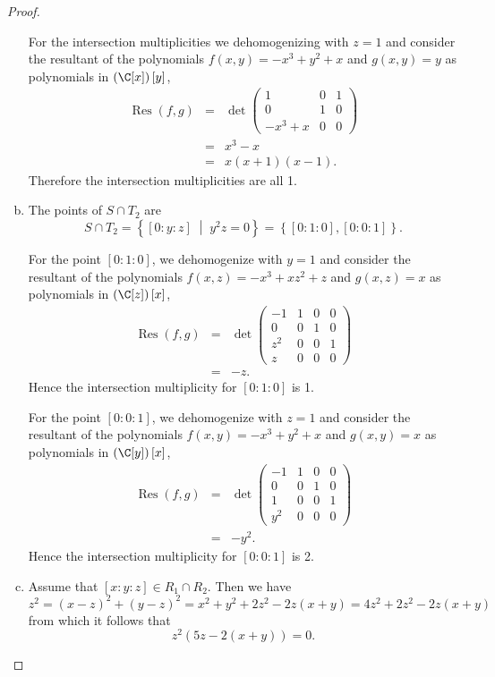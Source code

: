 \documentclass[10pt]{amsart}
\begin{document}
\begin{thm}
\begin{proof}
\begin{enumerate}[(a)]
      For the intersection multiplicities we dehomogenizing with $z = 1$ and consider the resultant of the polynomials $f(x,y) = -x^{3} + y^{2} + x$ and $g(x,y) = y$ as polynomials in $\left(\C[x]\right)[y]$,
      \begin{eqnarray*}
        \operatorname{Res}(f,g) &=& \det \left(\begin{array}{ccc}
          1 & 0 & 1 \\
          0 & 1 & 0 \\
          -x^{3} + x & 0 & 0
        \end{array}\right)\\
        &=& x^3 - x\\
        &=& x(x+1)(x-1).
      \end{eqnarray*}
      Therefore the intersection multiplicities are all 1.
    \item
      The points of $S \cap T_2$ are
      $$S \cap T_2 = \left\{ [0 : y : z] \;\middle\vert\; y^2z = 0 \right\} = \left\{[0 : 1 : 0], [0 : 0 : 1]\right\}.$$
      
      For the point $[0 : 1 : 0]$, we dehomogenize with $y = 1$ and consider the resultant of the polynomials $f(x,z) = -x^{3} + x z^{2} + z$ and $g(x,z) = x$ as polynomials in $\left(\C[z]\right)[x]$,
      \begin{eqnarray*}
        \operatorname{Res}(f,g) &=& \det\left(\begin{array}{cccc}
          -1 & 1 & 0 & 0 \\
          0 & 0 & 1 & 0 \\
          z^{2} & 0 & 0 & 1 \\
          z & 0 & 0 & 0
        \end{array}\right)\\
        &=& -z.
      \end{eqnarray*}
      Hence the intersection multiplicity for $[0 : 1 : 0]$ is 1.
      
      For the point $[0 : 0 : 1]$, we dehomogenize with $z = 1$ and consider the resultant of the polynomials $f(x,y) = -x^{3} + y^{2} + x$ and $g(x,y) = x$ as polynomials in $\left(\C[y]\right)[x]$,
      \begin{eqnarray*}
        \operatorname{Res}(f,g) &=& \det \left(\begin{array}{cccc}
          -1 & 1 & 0 & 0 \\
          0 & 0 & 1 & 0 \\
          1 & 0 & 0 & 1 \\
          y^{2} & 0 & 0 & 0
        \end{array}\right)\\
        &=& -y^2.
      \end{eqnarray*}
      Hence the intersection multiplicity for $[0 : 0 : 1]$ is 2.
    \item
      Assume that $[x : y : z] \in R_1 \cap R_2$.
      Then we have
      $$z^2 = (x - z)^2 + (y - z)^2 = x^2 + y^2 + 2z^2 - 2z(x + y) = 4z^2 + 2z^2 - 2z(x + y)$$
      from which it follows that
      $$z^2(5z - 2(x + y)) = 0.$$
      

\end{enumerate}
\end{proof}
\end{thm}
\end{document}
